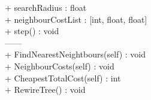 {
+ searchRadius : float\\
+ neighbourCostList : [int, float, float]\\
}
{
 + step() : void \\
 
 ------\\
 
 + FindNearestNeightbours(self) : void\\
 + NeighbourCosts(self) : void \\ %
 + CheapestTotalCost(self) : int \\
 + RewireTree() : void \\

}